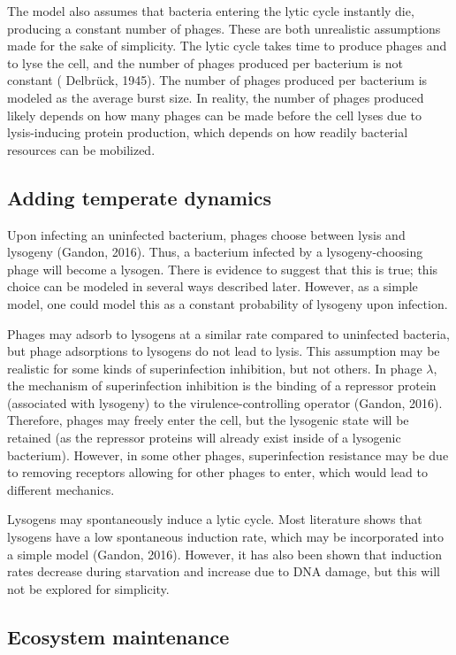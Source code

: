 \documentclass{article}
\begin{document}
The model also assumes that bacteria entering the lytic cycle instantly die, producing a constant number of phages. These are both unrealistic assumptions made for the sake of simplicity. The lytic cycle takes time to produce phages and to lyse the cell, and the number of phages produced per bacterium is not constant (	Delbrück, 1945). The number of phages produced per bacterium is modeled as the average burst size. In reality, the number of phages produced likely depends on how many phages can be made before the cell lyses due to lysis-inducing protein production, which depends on how readily bacterial resources can be mobilized. 

\subsection{Adding temperate dynamics}

Upon infecting an uninfected bacterium, phages choose between lysis and lysogeny (Gandon, 2016). Thus, a bacterium infected by a lysogeny-choosing phage will become a lysogen. There is evidence to suggest that this is true; this choice can be modeled in several ways described later. However, as a simple model, one could model this as a constant probability of lysogeny upon infection. 

Phages may adsorb to lysogens at a similar rate compared to uninfected bacteria, but phage adsorptions to lysogens do not lead to lysis. This assumption may be realistic for some kinds of superinfection inhibition, but not others. In phage $\lambda$, the mechanism of superinfection inhibition is the binding of a repressor protein (associated with lysogeny) to the virulence-controlling operator (Gandon, 2016). Therefore, phages may freely enter the cell, but the lysogenic state will be retained (as the repressor proteins will already exist inside of a lysogenic bacterium). However, in some other phages, superinfection resistance may be due to removing receptors allowing for other phages to enter, which would lead to different mechanics. 

Lysogens may spontaneously induce a lytic cycle. Most literature shows that lysogens have a low spontaneous induction rate, which may be incorporated into a simple model (Gandon, 2016). However, it has also been shown that induction rates decrease during starvation and increase due to DNA damage, but this will not be explored for simplicity.

\subsection{Ecosystem maintenance}
\end{document}
